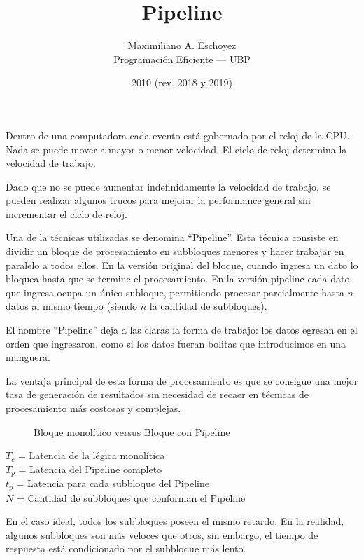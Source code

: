 \documentclass[a4paper, 11pt]{article}
\title{Pipeline}
\author{Maximiliano A. Eschoyez\\ Programación Eficiente --- UBP}
\date{2010 (rev. 2018 y 2019)}
\begin{document}
\maketitle

Dentro de una computadora cada evento está gobernado por el reloj de
la CPU. Nada se puede mover a mayor o menor velocidad. El ciclo de
reloj determina la velocidad de trabajo.

Dado que no se puede aumentar indefinidamente la velocidad de trabajo,
se pueden realizar algunos trucos para mejorar la performance general
sin incrementar el ciclo de reloj.

Una de la técnicas utilizadas se denomina ``Pipeline''. Esta técnica
consiste en dividir un bloque de procesamiento en subbloques menores y
hacer trabajar en paralelo a todos ellos. En la versión original del
bloque, cuando ingresa un dato lo bloquea hasta que se termine el
procesamiento. En la versión pipeline cada dato que ingresa ocupa un
único subloque, permitiendo procesar parcialmente hasta $n$ datos al
mismo tiempo (siendo $n$ la cantidad de subbloques).

El nombre ``Pipeline'' deja a las claras la forma de trabajo: los
datos egresan en el orden que ingresaron, como si los datos fueran
bolitas que introducimos en una manguera.

La ventaja principal de esta forma de procesamiento es que se consigue
una mejor tasa de generación de resultados sin necesidad de recaer en
técnicas de procesamiento más costosas y complejas.

\begin{figure}[h]
  \centering
%
%
  \caption{Bloque monolítico versus Bloque con Pipeline}
\end{figure}

\noindent
$T_c$ = Latencia de la légica monolítica \\
$T_p$ = Latencia del Pipeline completo \\
$t_p$ = Latencia para cada subbloque del Pipeline \\
$N$ = Cantidad de subbloques que conforman el Pipeline

En el caso ideal, todos los subbloques poseen el mismo retardo. En la
realidad, algunos subbloques son más veloces que otros, sin embargo,
el tiempo de respuesta está condicionado por el subbloque más lento.
\end{document}
